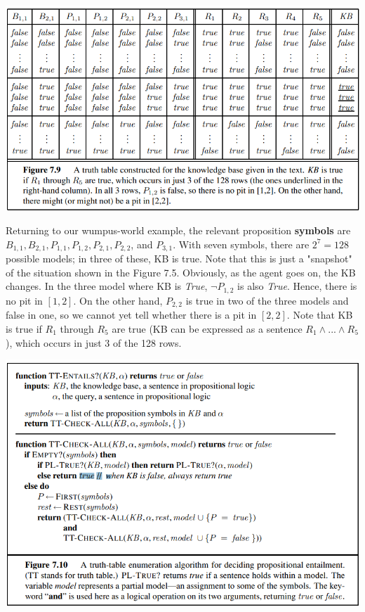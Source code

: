 \begin{center}
    \includegraphics[]{images/wumpus-table.png}
\end{center}
Returning to our wumpus-world example, the relevant proposition \textbf{symbols} are $B_{1,1}, B_{2,1}, P_{1,1}, P_{1,2}, P_{2,1}, P_{2,2}$, and $P_{3,1}$. With seven symbols, there are $2^7 = 128$ possible models; in three of these, KB is true. Note that this is just a "snapshot" of the situation shown in the Figure 7.5. Obviously, as the agent goes on, the KB changes. In the three model where KB is \textit{True}, $\neg P_{1,2}$ is also \textit{True}. Hence, there is no pit in $[1,2]$. On the other hand, $P_{2,2}$ is true in two of the three models and false in one, so we cannot yet tell whether there is a pit in $[2,2]$. Note that KB is true if $R_1$ through $R_5$ are true (KB can be expressed as a sentence $R_1 \land ... \land R_5$), which occurs in just 3 of the 128 rows.
\begin{center}
    \includegraphics[]{images/tt-algorithm.png}
\end{center}
